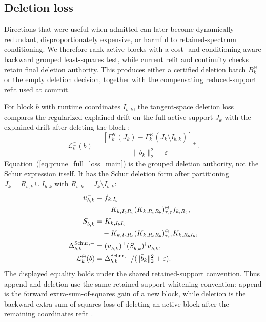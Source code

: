 \documentclass[
  reprint,
  amsmath,
  amssymb,
  aps,
  pra,
  nofootinbib,
  superscriptaddress,
  floatfix
]{revtex4-2}
\newcommand{\eps}{\varepsilon}
\begin{document}
\subsection{Deletion loss}

Directions that were useful when admitted can later become dynamically redundant, disproportionately expensive, or harmful to retained-spectrum conditioning.  We therefore rank active blocks with a cost- and conditioning-aware backward grouped least-squares test, while current refit and continuity checks retain final deletion authority.  This produces either a certified deletion batch $B_k^{\ominus}$ or the empty deletion decision, together with the compensating reduced-support refit used at commit.

For block $b$ with runtime coordinates $I_{b,k}$, the tangent-space deletion loss compares the regularized explained drift on the full active support $J_k$ with the explained drift after deleting the block \cite{YuanLin2006}:
\begin{equation}
\mathcal L_k^{\ominus}(b)
=
\frac{
\left[
\Gamma_k^{K}(J_k)
-
\Gamma_k^{K}(J_k\setminus I_{b,k})
\right]_+
}{
\|\bar b_k\|_2^2+\eps
}.
\label{eq:prune_full_loss_main}
\end{equation}
Equation~(\ref{eq:prune_full_loss_main}) is the grouped deletion authority, not the Schur expression itself.  It has the Schur deletion form after partitioning $J_k=R_{b,k}\cup I_{b,k}$ with $R_{b,k}=J_k\setminus I_{b,k}$:
\begingroup
\small
\begin{equation*}
\begin{aligned}
u_{b,k}^{-}
&=f_{k,I_b}\\
&\quad-K_{k,I_bR_b}(K_{k,R_bR_b})_{\tau,\eps}^{\oplus}f_{k,R_b},\\
S_{b,k}^{-}
&=K_{k,I_bI_b}\\
&\quad-K_{k,I_bR_b}(K_{k,R_bR_b})_{\tau,\eps}^{\oplus}K_{k,R_bI_b},\\
\Delta_{b,k}^{\rm Schur,-}
&=(u_{b,k}^{-})^{\top}(S_{b,k}^{-})^{\dagger}u_{b,k}^{-},\\
\mathcal L_k^{\ominus}(b)
&=\Delta_{b,k}^{\rm Schur,-}/(\|\bar b_k\|_2^2+\eps).
\end{aligned}
\end{equation*}
\endgroup
The displayed equality holds under the shared retained-support convention.  Thus append and deletion use the same retained-support whitening convention: append is the forward extra-sum-of-squares gain of a new block, while deletion is the backward extra-sum-of-squares loss of deleting an active block after the remaining coordinates refit \cite{FrischWaugh1933,Lovell1963}.
\end{document}

